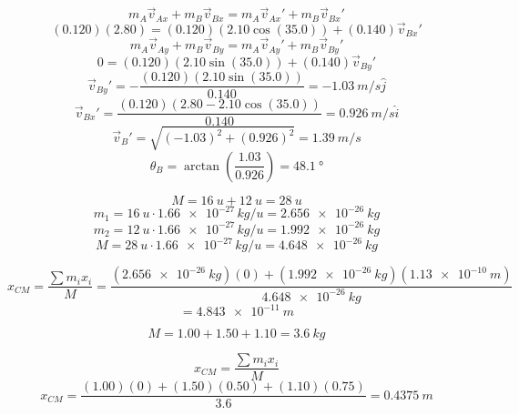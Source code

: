 \documentclass[11pt]{homework}
\begin{document}
\setcounter{questionCounter}{46}
\question
\begin{alphaparts}
    \questionpart
    \[
    m_{A}\vec{v}_{Ax}+m_{B}\vec{v}_{Bx}=m_{A}\vec{v}_{Ax}'+m_{B}\vec{v}_{Bx}'
    \]
    \[
        (0.120)(2.80)=(0.120)(2.10 \cos(35.0))+(0.140)\vec{v}_{Bx}'
    \]
    \[
    m_{A}\vec{v}_{Ay}+m_{B}\vec{v}_{By}=m_{A}\vec{v}_{Ay}'+m_{B}\vec{v}_{By}'
    \]
    \[
        0 = (0.120)(2.10 \sin(35.0))+(0.140)\vec{v}_{By}'
    \]
    \questionpart
    \[
        \vec{v}_{By}' = -\frac{(0.120)(2.10 \sin(35.0))}{0.140}=\qty{-1.03}{m / s \hat{j}}
    \]
    \[
        \vec{v}_{Bx}'=\frac{(0.120)(2.80-2.10 \cos(35.0))}{0.140}=\qty{0.926}{m /s \hat{i}}
    \]
    \[
    \vec{v}_B' = \sqrt{(-1.03)^2+(0.926)^2} =\boxed{\qty{1.39}{m /s}}
    \]
    \[
    \theta_B = \arctan\left(\frac{1.03}{0.926}\right) = \boxed{\qty{48.1}{\degree}}
    \]
\end{alphaparts}

\setcounter{questionCounter}{53}
\question
\[
M=\qty{16}{u} + \qty{12}{u} = \qty{28}{u}
\]
\[
    m_1 = \qty{16}{u} \cdot \qty{1.66e-27} \, kg / u = \qty{2.656e-26}{kg}
\]
\[
    m_2 = \qty{12}{u} \cdot \qty{1.66e-27} \, kg / u = \qty{1.992e-26}{kg}
\]
\[
    M = \qty{28}{u} \cdot \qty{1.66e-27} \, kg / u = \qty{4.648e-26}{kg}
\]


\[
    x_{CM}=\frac{\sum m_{i}x_{i}}{M} = \frac{(\qty{2.656e-26}{kg})(0)+(\qty{1.992e-26}{kg})(\qty{1.13e-10}{m})}{\qty{4.648e-26}{kg}}
\]
\[
= \boxed{\qty{4.843e-11}{m}}
\]


\question
\[
M = 1.00 + 1.50 + 1.10 = \qty{3.6}{kg}
\]

\[
x_{CM}=\frac{\sum m_{i}x_{i}}{M}
\]
\[
    x_{CM}=\frac{(1.00)(0)+(1.50)(0.50)+(1.10)(0.75)}{3.6}=\boxed{\qty{0.4375}{m}}
\]
\end{document}
